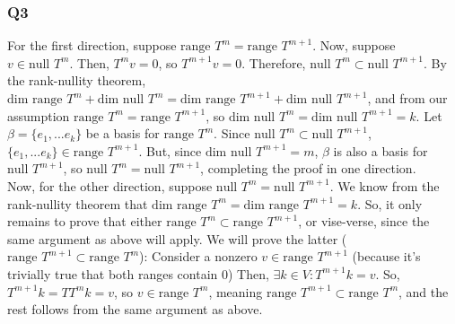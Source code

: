 \documentclass{article}
\newcommand{\range}[1]{\text{range }{#1}}
\newcommand{\drange}[1]{\text{dim range }{#1}}
\newcommand{\Null}[1]{\text{null }{#1}}
\newcommand{\dnull}[1]{\text{dim null }{#1}}
\newcommand{\tm}{T^{m}}
\newcommand{\Tm}{T^{m+1}}
\begin{document}
\subsubsection*{Q3}
For the first direction, suppose $\range{T^{m}} = \range{T^{m+1}}$. Now, suppose $v\in \Null{T^{m}}$. Then, $T^{m}v = 0$, so $T^{m+1}v = 0$. Therefore, $\Null{T^{m}} \subset \Null{T^{m+1}}$. By the rank-nullity theorem, $\drange{T^{m}} + \dnull{T^{m}} = \drange{\Tm} + \dnull{\Tm}$, and from our assumption $\range{\tm} = \range{\Tm}$, so $\dnull{\tm} = \dnull{\Tm} = k$. Let $\beta = \{e_{1}, ... e_{k}\}$ be a basis for $\range{\tm}$. Since  $\Null{T^{m}} \subset \Null{T^{m+1}}$, $\{e_{1}, ... e_{k}\} \in \range{\Tm}$. But, since $\dnull{\Tm} = m$, $\beta$ is also a basis for $\Null{\Tm}$, so $\Null{\tm} = \Null{\Tm}$, completing the proof in one direction.\\


\noindent Now, for the other direction, suppose $\Null{\tm} = \Null{\Tm}$. We know from the rank-nullity theorem that $\drange{\tm} = \drange{\Tm} = k$. So, it only remains to prove that either $\range{\tm} \subset \range{\Tm}$, or vise-verse, since the same argument as above will apply. We will prove the latter ( $\range{\Tm} \subset \range{\tm}$):
Consider a nonzero $v \in \range{\Tm}$ (because it's trivially true that both ranges contain 0) Then, $\exists k \in V: \Tm k = v$. So, $\Tm k = T\tm k = v$, so $v \in \range{\tm}$, meaning $\range{\Tm} \subset \range{\tm}$, and the rest follows from the same argument as above.
\end{document}
